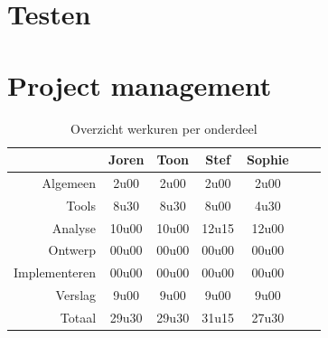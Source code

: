 \documentclass[i1]{oss}
\begin{document}
%

\section{Testen}
\label{ssec:testen}


\section{Project management}
\label{ssec:Projectmanag}


\begin{table}[h!]
\begin{center}
    \begin{tabular}{ r | c  c  c  c  c  c}
     & Joren & Toon & Stef & Sophie \\ \hline
    Algemeen & 2u00 & 2u00 & 2u00 & 2u00\\
           Tools & 8u30 & 8u30 & 8u00 & 4u30 \\
        Analyse & 10u00 & 10u00 & 12u15 & 12u00 \\
        Ontwerp & 00u00 & 00u00 & 00u00 & 00u00 \\
        Implementeren & 00u00 & 00u00 & 00u00 & 00u00\\
        Verslag & 9u00 & 9u00 & 9u00 & 9u00 \\
        Totaal & 29u30 & 29u30 & 31u15 & 27u30  
    \end{tabular}
    \caption{Overzicht werkuren per onderdeel}
    \label{tab:werkuren}
\end{center}
\end{table}
\end{document}
